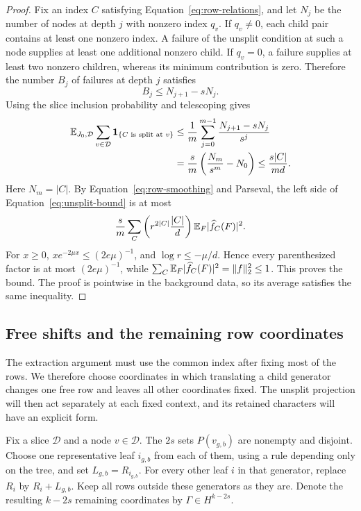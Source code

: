 \begin{proof}
Fix an index $C$ satisfying Equation~\eqref{eq:row-relations},
and let $N_j$ be the number of nodes at depth $j$ with nonzero
index $q_v$.  If $q_v\ne0$, each child pair contains at least
one nonzero index.  A failure of the unsplit condition at such a
node supplies at least one additional nonzero child.  If $q_v=0$,
a failure supplies at least two nonzero children, whereas its
minimum contribution is zero.  Therefore the number $B_j$ of
failures at depth $j$ satisfies
\[
 B_j\le N_{j+1}-sN_j.
\]
Using the slice inclusion probability and telescoping gives
\begin{align*}
 \mathbb E_{J_0,\mathcal D}\sum_{v\in\mathcal D}
          \mathbf 1_{\{C\text{ is split at }v\}}
 &\le \frac1m\sum_{j=0}^{m-1}
          \frac{N_{j+1}-sN_j}{s^j}\\
 &=\frac{s}{m}\left(\frac{N_m}{s^m}-N_0\right)
 \le\frac{s|C|}{md}.
\end{align*}
Here $N_m=|C|$.  By Equation~\eqref{eq:row-smoothing} and
Parseval, the left side of Equation~\eqref{eq:unsplit-bound}
is at most
\[
 \frac{s}{m}\sum_C
   \left(r^{2|C|}\frac{|C|}{d}\right)
           \mathbb E_F|\widehat f_C(F)|^2.
\]
For $x\ge0$, $xe^{-2\mu x}\le(2e\mu)^{-1}$, and
$\log r\le-\mu/d$.  Hence every parenthesized factor is at
most $(2e\mu)^{-1}$, while
$\sum_C\mathbb E_F|\widehat f_C(F)|^2=\lVert f\rVert_2^2\le1$.
This proves the bound.  The proof is pointwise in the background
data, so its average satisfies the same inequality.
\end{proof}

\subsection{Free shifts and the remaining row coordinates}

The extraction argument must use the common index after fixing most
of the rows. We therefore choose coordinates in which translating a
child generator changes one free row and leaves all other coordinates
fixed. The unsplit projection will then act separately at each fixed
context, and its retained characters will have an explicit form.

Fix a slice $\mathcal D$ and a node $v\in\mathcal D$.
The $2s$ sets $P(v_{g,b})$ are nonempty and disjoint.
Choose one representative leaf $i_{g,b}$ from each of them,
using a rule depending only on the tree, and set
$L_{g,b}=R_{i_{g,b}}$.  For every other leaf $i$ in that
generator, replace $R_i$ by $R_i+L_{g,b}$.  Keep all rows outside
these generators as they are.  Denote the resulting $k-2s$
remaining coordinates by $\Gamma\in H^{k-2s}$.

